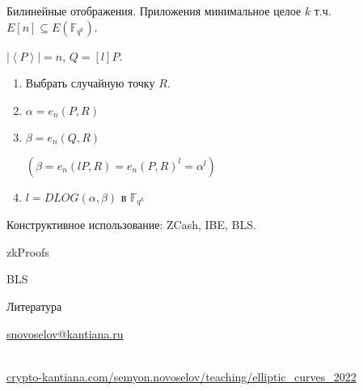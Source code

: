 \documentclass{beamer}
\begin{document}
\begin{frame}{Билинейные отображения. Приложения}
 минимальное целое $k$ т.ч. {\small $E[n] \subseteq E(\mathbb{F}_{q^k})$}.

\vspace{1em}

 $|\left<P\right>| = n$, $Q = [l] P$.
    \begin{enumerate}
        \item Выбрать случайную точку $R$.
        \item $\alpha = e_n(P, R)$
        \item $\beta  = e_n(Q, R)$ \hfill 
        \begin{scriptsize}
        $(\beta = e_n(l P, R) = e_n(P, R)^l = \alpha^l)$
        \end{scriptsize}
        \item $l = DLOG(\alpha, \beta)$ в $\mathbb{F}_{q^k}$
    \end{enumerate}    

\vspace{1em}
Конструктивное использование: ZCash, IBE, BLS.
\end{frame}

\begin{frame}{zkProofs}
\end{frame}

\begin{frame}{BLS}
\end{frame}

\begin{frame}{Литература}
\nocite{Menezes1993}\nocite{Blake1999}\nocite{Washington2008}

\printbibliography


\begin{center}
    \begin{tcolorbox}[enhanced,hbox,colback=block-green-color-bg,colframe=subsection-color!120,title=Контакты,center title]
        \begin{varwidth}{\textwidth}
            \begin{center}
                \href{mailto:snovoselov@kantiana.ru}{snovoselov@kantiana.ru}
            \end{center}
        \end{varwidth}
    \end{tcolorbox}	
\end{center}

\\
{\footnotesize
    \href{https://crypto-kantiana.com/semyon.novoselov/teaching/elliptic_curves_2022}{crypto-kantiana.com/semyon.novoselov/teaching/elliptic\_curves\_2022}
}
\end{frame}
\end{document}
